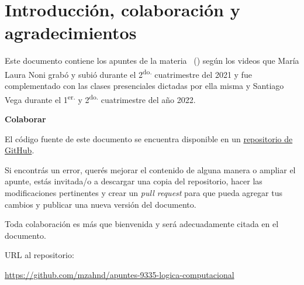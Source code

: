 \chapter{Introducción, colaboración y agradecimientos}

Este documento contiene los apuntes de la materia \materia \, (\codigomateria)
según los videos que María Laura Noni grabó y subió durante el
2\textsuperscript{do.} cuatrimestre del 2021 y fue complementado con las clases
presenciales dictadas por ella misma y Santiago Vega durante el
1\textsuperscript{er.} y 2\textsuperscript{do.} cuatrimestre del año 2022.

\bigskip

\textbf{\large{Colaborar}}

\smallskip

El código fuente de este documento se encuentra disponible en un
\href{%
https://github.com/mzahnd/apuntes-9335-logica-computacional
}{repositorio de GitHub}.

Si encontrás un error, querés mejorar el contenido de alguna manera o ampliar
el apunte, estás invitada/o a descargar una copia del repositorio, hacer las
modificaciones pertinentes y crear un \textit{pull request} para que pueda
agregar tus cambios y publicar una nueva versión del documento.

Toda colaboración es más que bienvenida y será adecuadamente citada en el
documento.

\bigskip

URL al repositorio:

\smallskip

\href{https://github.com/mzahnd/apuntes-9335-logica-computacional}{%
https://github.com/mzahnd/apuntes-9335-logica-computacional
}

